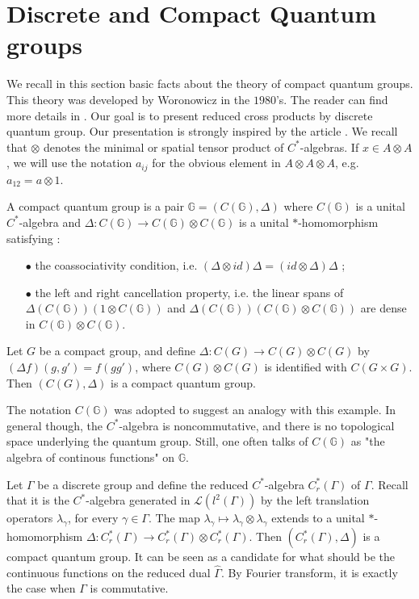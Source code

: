 \section{Discrete and Compact Quantum groups}

We recall in this section basic facts about the theory of compact quantum groups. This theory was developed by Woronowicz in the $1980$'s. The reader can find more details in \cite{Wo}. Our goal is to present reduced cross products by discrete quantum group. Our presentation is strongly inspired by the article \cite{VerVaes}. We recall that $\otimes$ denotes the minimal or spatial tensor product of $C^*$-algebras. If $x\in A\otimes A$, we will use the notation $a_{ij}$ for the obvious element in $A\otimes A\otimes A$, e.g. $a_{12} = a\otimes 1$.

\begin{definition}
A compact quantum group is a pair $\mathbb G = (C(\mathbb G),\Delta)$ where $C(\mathbb G)$ is a unital $C^*$-algebra and $\Delta : C(\mathbb G) \rightarrow C(\mathbb G)\otimes C(\mathbb G)$ is a unital $*$-homomorphism satisfying :
\begin{itemize}
\item[$\bullet$] the coassociativity condition, i.e. $(\Delta \otimes id)\Delta=(id\otimes \Delta )\Delta$ ;
\item[$\bullet$] the left and right cancellation property, i.e. the linear spans of $\Delta(C(\mathbb G))(1\otimes C(\mathbb G))$ and $\Delta(C(\mathbb G))(C(\mathbb G)\otimes C(\mathbb G))$ are dense in $C(\mathbb G)\otimes C(\mathbb G)$.
\end{itemize} 
\end{definition}

\begin{Expl} Let $G$ be a compact group, and define $\Delta : C(G)\rightarrow C(G)\otimes C(G)$ by $(\Delta f)(g,g') = f(gg')$, where $C(G)\otimes C(G)$ is identified with $C(G\times G)$. Then $(C(G),\Delta ) $ is a compact quantum group.
\end{Expl}

The notation $C(\mathbb G)$ was adopted to suggest an analogy with this example. In general though, the $C^*$-algebra is noncommutative, and there is no topological space underlying the quantum group. Still, one often talks of $C(\mathbb G)$ as "the algebra of continous functions" on $\mathbb G$.

\begin{Expl}
Let $\Gamma$ be a discrete group and define the reduced $C^*$-algebra $C_r^*(\Gamma)$ of $\Gamma$. Recall that it is the $C^*$-algebra generated in $\mathcal L(l^2(\Gamma))$ by the left translation operators $\lambda_\gamma$, for every $\gamma\in\Gamma$. The map $ \lambda_\gamma \mapsto \lambda_\gamma\otimes \lambda_\gamma$ extends to a unital $*$-homomorphism $\Delta :C_r^*(\Gamma)\rightarrow C_r^*(\Gamma)\otimes C_r^*(\Gamma) $. Then $(C_r^*(\Gamma),\Delta)$ is a compact quantum group. It can be seen as a candidate for what should be the continuous functions on the reduced dual $\hat\Gamma$. By Fourier transform, it is exactly the case when $\Gamma$ is commutative.
\end{Expl}

